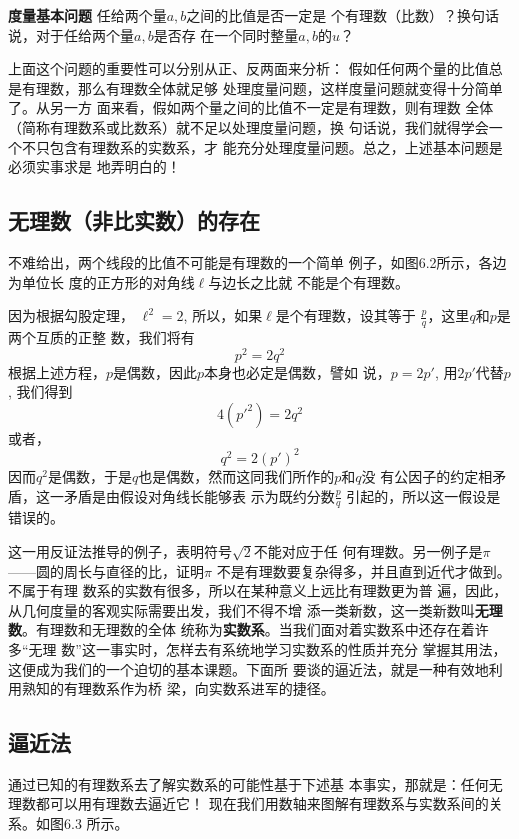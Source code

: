 \textbf{度量基本问题 } 任给两个量$a,b$之间的比值是否一定是
个有理数（比数）？换句话说，对于任给两个量$a,b$是否存
在一个同时整量$a,b$的$u$？

上面这个问题的重要性可以分别从正、反两面来分析：
假如任何两个量的比值总是有理数，那么有理数全体就足够
处理度量问题，这样度量问题就变得十分简单了。从另一方
面来看，假如两个量之间的比值不一定是有理数，则有理数
全体（简称有理数系或比数系）就不足以处理度量问题，换
句话说，我们就得学会一个不只包含有理数系的实数系，才
能充分处理度量问题。总之，上述基本问题是必须实事求是
地弄明白的！

\subsection{无理数（非比实数）的存在}
不难给出，两个线段的比值不可能是有理数的一个简单
例子，如图6.2所示，各边为单位长
度的正方形的对角线$\ell$与边长之比就
不能是个有理数。
\begin{figure}[htp]
    \centering
{}
    \caption{}
\end{figure}

因为根据勾股定理，
$\ell^2=2$, 所以，如果$\ell$是个有理数，设其等于
$\frac{p}{q}$，这里$q$和$p$是两个互质的正整
数，我们将有
\[p^2=2q^2\]
根据上述方程，$p$是偶数，因此$p$本身也必定是偶数，譬如
说，$p=2p'$, 用$2p'$代替$p$, 我们得到
\[4({p'}^2)=2q^2\]
或者，
\[q^2=2(p')^2\]
因而$q^2$是偶数，于是$q$也是偶数，然而这同我们所作的$p$和$q$没
有公因子的约定相矛盾，这一矛盾是由假设对角线长能够表
示为既约分数$\frac{p}{q}$
引起的，所以这一假设是错误的。

这一用反证法推导的例子，表明符号$\sqrt{2}$不能对应于任
何有理数。另一例子是$\pi$——圆的周长与直径的比，证明$\pi$
不是有理数要复杂得多，并且直到近代才做到。不属于有理
数系的实数有很多，所以在某种意义上远比有理数更为普
遍，因此，从几何度量的客观实际需要出发，我们不得不增
添一类新数，这一类新数叫\textbf{无理数}。有理数和无理数的全体
统称为\textbf{实数系}。当我们面对着实数系中还存在着许多“无理
数”这一事实时，怎样去有系统地学习实数系的性质并充分
掌握其用法，这便成为我们的一个迫切的基本课题。下面所
要谈的逼近法，就是一种有效地利用熟知的有理数系作为桥
梁，向实数系进军的捷径。

\subsection{逼近法}
通过已知的有理数系去了解实数系的可能性基于下述基
本事实，那就是：任何无理数都可以用有理数去逼近它！
现在我们用数轴来图解有理数系与实数系间的关系。如图6.3
所示。

